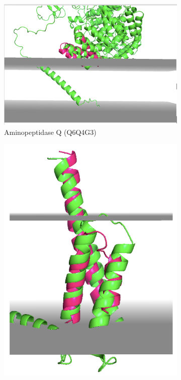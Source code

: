 \begin{figure}[htb]
    \centering %
\begin{subfigure}{0.4\textwidth}
  \includegraphics[width=\linewidth]{Pfam/Q6Q4G3.png}
  \caption{Aminopeptidase Q (Q6Q4G3) }
  \label{fig:q6q}
\end{subfigure}\hfil %
\begin{subfigure}{0.3\textwidth}
  \includegraphics[width=\linewidth]{Pfam/Q9BUV8.png}

\end{subfigure}
\end{figure}
